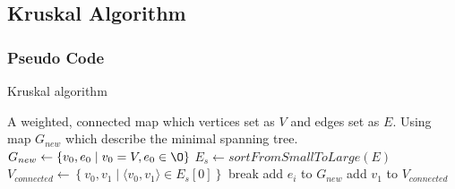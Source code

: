\documentclass[cs4size, punct, nospace, fancyhdr, fntef]{ctexart}
\begin{document}
  \subsection{Kruskal Algorithm}
      \subsubsection{Pseudo Code}
      \begin{algorithm}
      \caption{Kruskal algorithm}\label{kruskal}
      \begin{algorithmic}[1]
        \Require A weighted, connected map which vertices set as $V$ and edges set as $E$.
        \Ensure Using map $G_{new}$ which describe the minimal spanning tree.
        \State $G_{new}\gets\left\{v_0, e_0 \mid v_0=V, e_0 \in \O  \right\}$
        \State $E_s\gets sortFromSmallToLarge\left(E\right)$
        \State $V_{connected}\gets \left\{v_0, v_1\mid\langle v_0, v_1\rangle \in E_s\left[0\right]\right\}$
            \State break
          \EndIf
            \State add $e_i$ to $G_{new}$
            \State add $v_1$ to $V_{connected}$
          \EndIf
        \EndFor
      \EndFunction
      \end{algorithmic}
      \end{algorithm}
\end{document}
